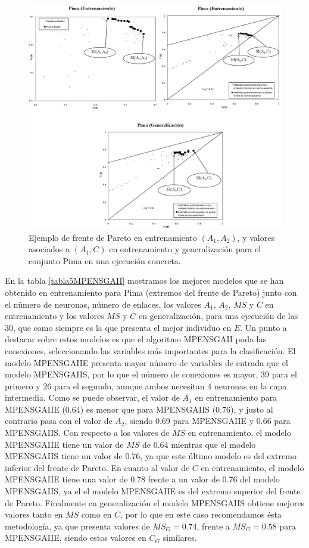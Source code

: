 \begin{figure}[!htb]
\centering
\includegraphics[keepaspectratio,width=13cm]{figuras/ejemploPima.jpg}
\caption{Ejemplo de frente de Pareto en entrenamiento $(A_{1},A_{2})$, y valores asociados
a $(A_{1},C)$ en entrenamiento y generalización para el conjunto Pima en una
ejecución
concreta.}
\label{ejemploPima}
\end{figure}
\newpage
En la tabla \ref{tabla5MPENSGAII} mostramos los mejores modelos que se han
obtenido en entrenamiento para Pima (extremos del frente de Pareto) junto con el número de
neuronas, número de enlaces, los valores $A_{1}$, $A_{2}$, $MS$ y $C$ en entrenamiento y
los valores $MS$ y $C$ en generalización, para una ejecución de las 30, que como
siempre es la que presenta el mejor individuo en $E$. Un punto a destacar sobre
estos modelos es que el algoritmo MPENSGAII poda las conexiones, seleccionando las
variables más importantes para la clasificación. El modelo MPENSGAIIE presenta mayor
número de variables de entrada que el modelo MPENSGAIIS, por lo que el número de
conexiones es mayor, 39 para el primero y 26 para el segundo, aunque ambos necesitan 4
neuronas en la capa intermedia. Como se puede observar, el valor de $A_{1}$ en
entrenamiento para MPENSGAIIE (0.64) es menor que para MPENSGAIIS (0.76), y justo al
contrario pasa con el valor de $A_{2}$, siendo 0.69 para MPENSGAIIE y 0.66 para
MPENSGAIIS. Con respecto a los valores de $MS$ en entrenamiento, el modelo
MPENSGAIIE tiene un valor de $MS$ de 0.64 mientras que el modelo MPENSGAIIS tiene un valor
de 0.76, ya que este último modelo es del extremo inferior del frente de Pareto. En
cuanto al valor de $C$ en entrenamiento, el modelo MPENSGAIIE tiene una valor de 0.78
frente a un valor de 0.76 del modelo MPENSGAIIS, ya el el modelo MPENSGAIIE es del
extremo superior del frente de Pareto. Finalmente en generalización el modelo MPENSGAIIS
obtiene mejores valores tanto en $MS$ como en $C$, por lo que en este caso recomendamos ésta
metodología, ya que presenta valores de $MS_{G}=0.74$, frente a $MS_{G}=0.58$ para MPENSGAIIE,
siendo estos valores en $C_{G}$ similares.

